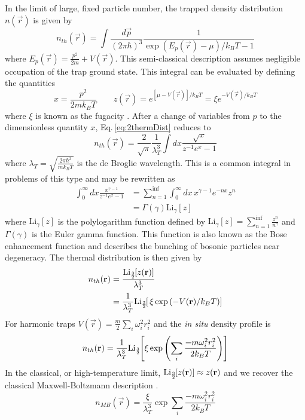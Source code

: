 In the limit of large, fixed particle number, the trapped density distribution $n(\vec{r})$ is given by
\begin{equation} \label{eq:2thermDist}
	n_{th}(\vec{r}) = \int \frac{d\vec{p}}{(2\pi\hbar)^3} \frac{1}{\exp{(E_p(\vec{r}) - \mu)/k_BT} - 1}
\end{equation}
where $E_p(\vec{r}) = \frac{p^2}{2m} + V(\vec{r})$.
This semi-classical description assumes negligible occupation of the trap ground state.
This integral can be evaluated by defining the quantities
\begin{equation*}
	x = \frac{p^2}{2mk_BT} \quad\quad z(\vec{r}) = e^{[\mu - V(\vec{r})]/k_BT} = \xi e^{-V(\vec{r})/k_BT}
\end{equation*}
where $\xi$ is known as the fugacity \cite{psm02}.
After a change of variables from $p$ to the dimensionless quantity $x$, Eq.\,\ref{eq:2thermDist} reduces to
\begin{equation}
	n_{th}(\vec{r}) = \frac{2}{\sqrt{\pi}}\frac{1}{\lambda_T^3}\int dx \frac{\sqrt{x}}{z^{-1}e^x-1}
\end{equation}
where $\lambda_T = \sqrt{\frac{2 \pi \hbar^2}{m k_B T}}$ is the de Broglie wavelength.
This is a common integral in problems of this type and may be rewritten as \cite{Demarco1998, Ketterle1999, psm02}
\begin{equation}
\begin{split}
	\int_0^{\infty}dx\frac{x^{\gamma-1}}{z^{-1}e^x-1} &= \sum_{n=1}^{\inf}\int_0^{\infty}dx \,x^{\gamma-1}e^{-nx}z^n \\
	&=\Gamma(\gamma)\text{Li}_{\gamma}[z]
\end{split}
\end{equation}
where $\text{Li}_{\gamma}[z]$ is the polylogarithm function defined by $\text{Li}_{\gamma}[z] = \sum_{n=1}^{\inf}\frac{z^n}{n^{\gamma}}$ and $\Gamma(\gamma)$ is the Euler gamma function.
This function is also known as the Bose enhancement function \cite{Ketterle1999} and describes the bunching of bosonic particles near degeneracy.
The thermal distribution is then given by
\begin{equation}
	\begin{split}
	n_{th}(\mathbf{r}) &= \frac{\text{Li}_{\scriptscriptstyle\frac{3}{2}\!}\!\left[ z(\mathbf{r}) \right]}{\lambda_T^3} \\
				 &= \frac{1}{\lambda_T^3}\text{Li}_{\scriptscriptstyle\frac{3}{2}\!}\!\left[ \,\xi\,\text{exp}\left( {-V(\mathbf{r})/k_BT} \right) \right]
	\end{split}
\end{equation}
For harmonic traps $V(\vec{r}) = \frac{m}{2}\displaystyle\sum_i\omega_i^2r_i^2$ and the \textit{in situ} density profile is
\begin{equation} \label{eq:harmTrapDist}
	n_{th}(\mathbf{r}) = \frac{1}{\lambda_T^3}\text{Li}_{\scriptscriptstyle\frac{3}{2}\!}\!\left[ \xi \,\text{exp}\left( {\sum_i\frac{-m\omega_i^2r_i^2}{2 k_B T}} \right) \right]
\end{equation}
In the classical, or high-temperature limit, $\text{Li}_{\scriptscriptstyle\frac{3}{2}\!}\!\left[ z(\mathbf{r}) \right] \approx z(\mathbf{r})$ and we recover the classical Maxwell-Boltzmann description \cite{psm02}.
\begin{equation}
	n_{MB}(\vec{r}) = \frac{\xi}{\lambda_T^3}\exp{\sum_i\frac{-m\omega_i^2r_i^2}{2 k_B T}}
\end{equation}


